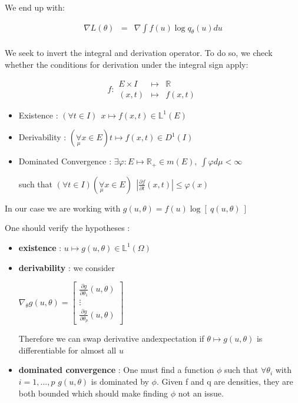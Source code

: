We end up with:


$$
\begin{array}{lcl}
\nabla L(\theta) &=& \nabla \displaystyle\int f(u) \log q_\theta(u) du
\\
\end{array}
$$

\bigskip

We seek to invert the integral and derivation operator. To do so, we check whether the conditions for derivation under the integral sign apply:


$$
f : \begin{array}{ccc}
E\times I&\mapsto& \mathbb R
\\
(x,t) &\mapsto& f(x,t)
\end{array}
$$





\begin{itemize}
    \item Existence :
        $(\forall t \in I) \ \ x \mapsto f(x,t) \in \mathbb L^1(E)$
    \item Derivability : 
        $(\underset{\mu}{\forall} x \in E) t \mapsto f(x,t) \in D^1(I)$
    \item Dominated Convergence : $\exists \varphi : E \mapsto \mathbb R_+ \in m(E), 
\ \int \varphi d\mu  < \infty$

such that $(\forall t \in I)(\underset \mu \forall x \in E) \ \ \left|\frac{\partial f}{\partial t}(x,t)\right| \leq \varphi(x)$
\end{itemize}

\bigskip


In our case we are working with $g(u, \theta) = f(u) \log\left[ \ q(u, \theta) \ \right]$

\bigskip

One should verify the hypotheses :

\bigskip

\begin{itemize}
    \item \textbf{existence} : $u \mapsto g(u, \theta) \in \mathds L^1(\Omega)$  

    \item \textbf{derivability} : we consider 
    
    $\nabla_\theta g(u, \theta) = \begin{bmatrix} \frac{\partial g}{\partial \theta_1}(u, \theta) \\ \vdots \\ \frac{\partial g}{\partial \theta_p}(u, \theta) \end{bmatrix}$

    \bigskip
    
    Therefore we can swap derivative andexpectation if $\theta \mapsto g(u,\theta)$ is differentiable for almost all $u$

    \item \textbf{dominated convergence} : One must find a function $\phi$ such that $\forall \theta_i$ with $i = 1, ..., p$ $g(u,\theta)$ is dominated by $\phi$. Given f and q are densities, they are both bounded which should make finding $\phi$ not an issue.
    
\end{itemize}

